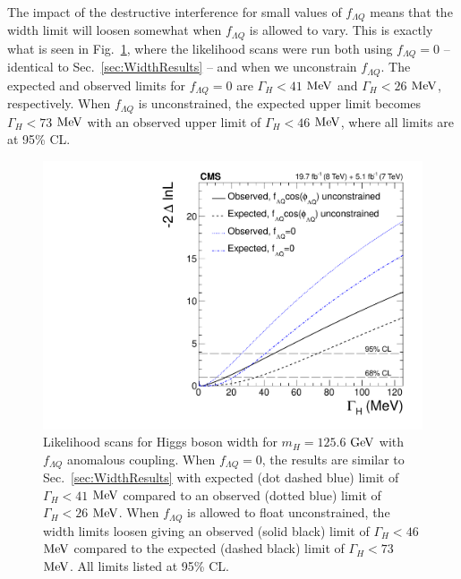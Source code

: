 The impact of the destructive interference for small values of $f_{\Lambda Q}$ means that the width limit will loosen somewhat when $f_{\Lambda Q}$ is allowed to vary. This is exactly what is seen in Fig.~\ref{fig:WidthLimitsWithfLQ}, where the likelihood scans were run both using $f_{\Lambda Q}=0$ -- identical to Sec.~\ref{sec:WidthResults} -- and when we unconstrain $f_{\Lambda Q}$. The expected and observed limits for $f_{\Lambda Q}=0$ are $\Gamma_H < 41$ $\rm{MeV}$ and $\Gamma_H < 26$ $\rm{MeV}$, respectively. When $f_{\Lambda Q}$ is unconstrained, the expected upper limit becomes $\Gamma_H < 73$ $\rm{MeV}$ with an observed upper limit of $\Gamma_H < 46$ $\rm{MeV}$, where all limits are at 95\% CL.

\begin{figure}[htbp]
\begin{center}
\includegraphics[width=.9\linewidth]{HiggsProperties/figures/width_1DScan_GGsm.pdf}
\caption[Expected and Observed Limits on Higgs Boson Width with Anomalous Coupling]{Likelihood scans for Higgs boson width for $m_{H}=125.6$ $\rm{GeV}$ with $f_{\Lambda Q}$ anomalous coupling. When $f_{\Lambda Q}=0$, the results are similar to Sec.~\ref{sec:WidthResults} with expected (dot dashed blue) limit of $\Gamma_H < 41$ $\rm{MeV}$ compared to an observed (dotted blue) limit of $\Gamma_H < 26$ $\rm{MeV}$. When $f_{\Lambda Q}$ is allowed to float unconstrained, the width limits loosen giving an observed (solid black) limit of $\Gamma_H < 46$ $\rm{MeV}$ compared to the expected (dashed black) limit of $\Gamma_H < 73$ $\rm{MeV}$. All limits listed at 95\% CL.}
\label{fig:WidthLimitsWithfLQ}
\end{center}
\end{figure}

